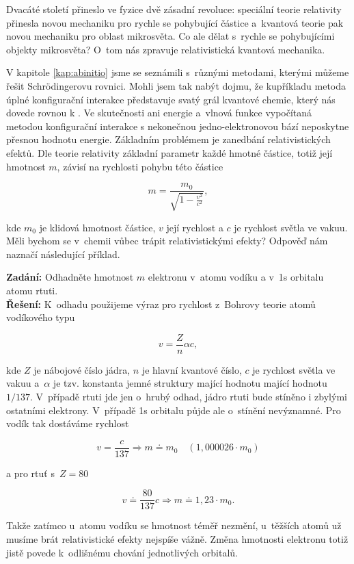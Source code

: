 Dvacáté století přineslo ve fyzice dvě zásadní revoluce: speciální teorie relativity přinesla novou mechaniku pro rychle se pohybující částice a~kvantová teorie pak novou mechaniku pro oblast mikrosvěta. Co ale dělat s~rychle se pohybujícími objekty mikrosvěta? O~tom nás zpravuje relativistická kvantová mechanika. 

V kapitole \ref{kap:abinitio} jsme se seznámili s~různými metodami, kterými můžeme řešit Schr\"odingerovu rovnici. Mohli jsem tak nabýt dojmu, že kupříkladu metoda úplné konfigurační interakce představuje svatý grál kvantové chemie, který nás dovede rovnou k . Ve skutečnosti ani energie a~vlnová funkce vypočítaná metodou konfigurační interakce s nekonečnou jedno-elektronovou bází neposkytne přesnou hodnotu energie. Základním problémem je zanedbání relativistických efektů. Dle teorie relativity základní parametr každé hmotné částice, totiž její hmotnost $m$, závisí na rychlosti pohybu této částice

\begin{equation}
m = \frac{m_0}{\sqrt{1 - \frac{v^2}{c^2}}},
\label{rov:Rel-1}
\end{equation}

\noindent kde $m_0$ je klidová hmotnost částice, $v$ její rychlost a  $c$ je rychlost světla ve vakuu. Měli bychom se v~chemii vůbec trápit relativistickými efekty? Odpověď nám naznačí následující příklad.

\begin{priklad}
\textbf{Zadání:} Odhadněte hmotnost $m$ elektronu v~atomu vodíku a v~1s orbitalu atomu rtuti.\\[0.1cm]
\textbf{Řešení:} K~odhadu použijeme výraz pro rychlost z~Bohrovy teorie atomů vodíkového typu

\begin{displaymath}
v = \frac{Z}{n} \alpha c,
\end{displaymath}

\noindent kde $Z$ je nábojové číslo jádra, $n$ je hlavní kvantové číslo, $c$ je rychlost světla ve vakuu a~$\alpha$ je tzv. konstanta jemné struktury mající hodnotu mající hodnotu $1/137$. V~případě rtuti jde jen o~hrubý odhad, jádro rtuti bude stíněno i zbylými ostatními elektrony. V~případě 1s orbitalu půjde ale o~stínění nevýznamné. Pro vodík tak dostáváme rychlost

\begin{displaymath}
v = \frac{c}{137} \Rightarrow m \doteq m_0 \quad (1{,}000026 \cdot m_0)
\end{displaymath}

\noindent a pro rtuť s~$Z=80$

\begin{displaymath}
v \doteq \frac{80}{137} c \Rightarrow m \doteq 1{,}23 \cdot m_0.
\end{displaymath}

\noindent Takže zatímco u~atomu vodíku se hmotnost téměř nezmění, u~těžších atomů už musíme brát relativistické efekty nejspíše vážně. Změna hmotnosti elektronu totiž jistě povede k~odlišnému chování jednotlivých orbitalů.
\end{priklad}

